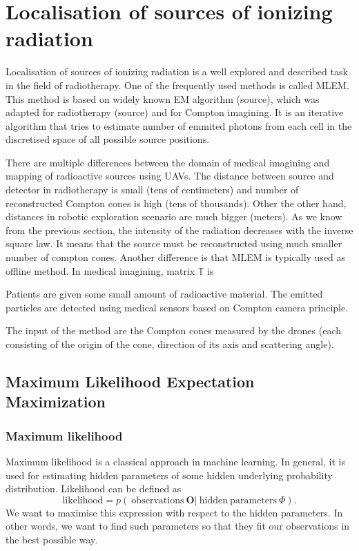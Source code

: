 \section{Localisation of sources of ionizing radiation}

Localisation of sources of ionizing radiation is a well explored and described task in the field of radiotherapy.
One of the frequently used methods is called \ac{MLEM}.
This method is based on widely known EM algorithm (source), which was adapted for radiotherapy (source) and for Compton imagining.
It is an iterative algorithm that tries to estimate number of emmited photons from each cell in the discretised space of all possible source positions.





There are multiple differences between the domain of medical imagining and mapping of radioactive sources using \ac{UAV}s.
The distance between source and detector in radiotherapy is small (tens of centimeters) and number of reconstructed Compton cones is high (tens of thousands).
Other the other hand, distances in robotic exploration scenario are much bigger (meters). 
As we know from the previous section, the intensity of the radiation decreases with the inverse square law.
It means that the source must be reconstructed using much smaller number of compton cones.
Another difference is that \ac{MLEM} is typically used as offline method.
In medical imagining, matrix $\mathbb{T}$ is 




Patients are given some small amount of radioactive material.
The emitted particles are detected using medical sensors based on Compton camera principle.

The input of the method are the Compton cones measured by the drones (each consisting of the origin of the cone, direction of its axis and scattering angle). 

\subsection{Maximum Likelihood Expectation Maximization}

\subsubsection{Maximum likelihood}
Maximum likelihood is a classical approach in machine learning.
In general, it is used for estimating hidden parameters of some hidden underlying probability distribution.
Likelihood can be defined as 
\begin{equation}
  \mathrm{likelihood} = p(\ \mathrm{observations } \  \boldsymbol{O} | \ \mathrm{hidden \ parameters\ } \Phi ).
  \label{eq:likelihood}
\end{equation}
We want to maximise this expression with respect to the hidden parameters.
In other words, we want to find such parameters so that they fit our observations in the best possible way.



